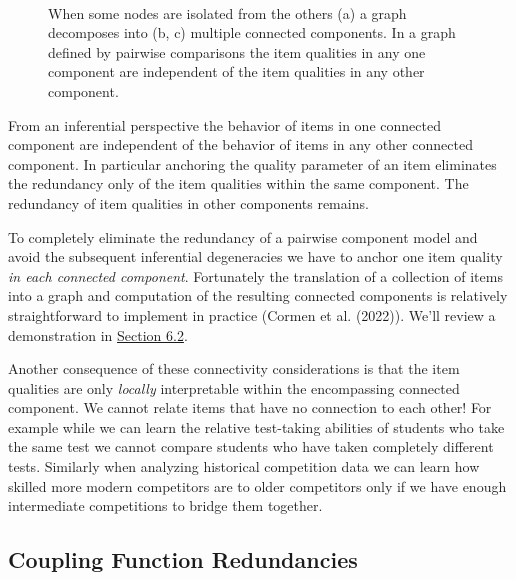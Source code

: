 \documentclass[
  letterpaper,
  DIV=11,
  numbers=noendperiod]{scrartcl}
\begin{document}
\begin{figure}
\begin{minipage}{0.33\linewidth}
{}

\subcaption{\label{fig-graph-decomposition3}}

\end{minipage}%
%
\begin{minipage}{0.01\linewidth}
~\end{minipage}%

\caption{\label{fig-graph-decomposition}When some nodes are isolated
from the others (a) a graph decomposes into (b, c) multiple connected
components. In a graph defined by pairwise comparisons the item
qualities in any one component are independent of the item qualities in
any other component.}

\end{figure}%

From an inferential perspective the behavior of items in one connected
component are independent of the behavior of items in any other
connected component. In particular anchoring the quality parameter of an
item eliminates the redundancy only of the item qualities within the
same component. The redundancy of item qualities in other components
remains.

To completely eliminate the redundancy of a pairwise component model and
avoid the subsequent inferential degeneracies we have to anchor one item
quality \emph{in each connected component}. Fortunately the translation
of a collection of items into a graph and computation of the resulting
connected components is relatively straightforward to implement in
practice (Cormen et al. (2022)). We'll review a demonstration in
\hyperref[sec:graph-utils]{Section 6.2}.

Another consequence of these connectivity considerations is that the
item qualities are only \emph{locally} interpretable within the
encompassing connected component. We cannot relate items that have no
connection to each other! For example while we can learn the relative
test-taking abilities of students who take the same test we cannot
compare students who have taken completely different tests. Similarly
when analyzing historical competition data we can learn how skilled more
modern competitors are to older competitors only if we have enough
intermediate competitions to bridge them together.

\subsection{Coupling Function
Redundancies}\label{coupling-function-redundancies}
\end{document}
